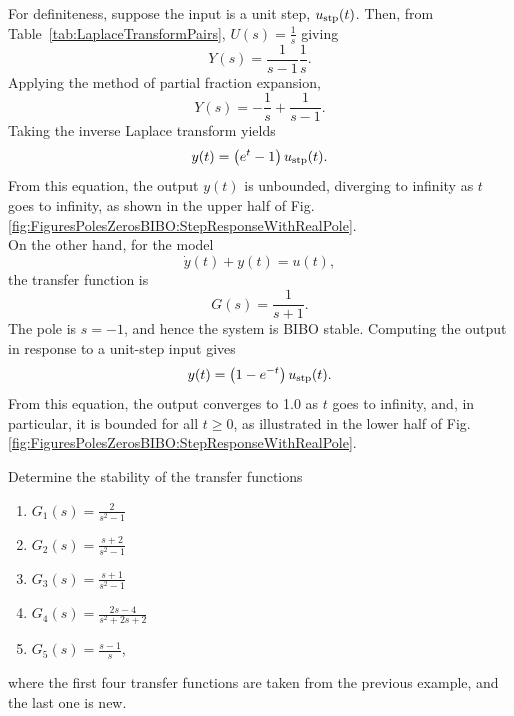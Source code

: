 For definiteness, suppose the input is a unit step, $u_{\rm stp}(t)$. Then, from Table~\ref{tab:LaplaceTransformPairs}, $U(s) = \frac{1}{s}$ giving
$$Y(s) = \frac{1}{s-1} \frac{1}{s}.$$
Applying the method of partial fraction expansion,
$$Y(s) = -\frac{1}{s} + \frac{1}{s-1}.$$
Taking the inverse Laplace transform yields
\begin{equation}
\label{eqn:PolesZerosBIBO:FirstOrderOutputUnstable}
y(t) =\left(e^{t} -1\right) u_{\rm stp}(t).
\end{equation}
From this equation, the output $y(t)$ is unbounded, diverging to infinity as $t$ goes to infinity, as shown in the upper half of Fig. \ref{fig:FiguresPolesZerosBIBO:StepResponseWithRealPole}.\\

On the other hand, for the model
$$ \dot{y}(t) + y(t) = u(t),$$
the transfer function is
$$G(s) = \frac{1}{s+1}.$$
The pole is $s=-1$, and hence the system is BIBO stable. Computing the output in response to a unit-step input gives
\begin{equation}
\label{eqn:PolesZerosBIBO:FirstOrderOutputStable}
y(t) = \left(1-e^{-t} \right) u_{\rm stp}(t).
\end{equation}
From this equation, the output converges to 1.0 as $t$ goes to infinity, and, in particular, it is bounded for all $t\ge0$, as illustrated in the lower half of Fig. \ref{fig:FiguresPolesZerosBIBO:StepResponseWithRealPole}.


\vspace*{.2cm}
\begin{example}
\label{ex:BIBOstabilityOL}
    Determine the stability of the transfer functions 
\begin{enumerate}
\renewcommand{\labelenumi}{(\alph{enumi})}
\setlength{\itemsep}{.2cm}
\item $G_1(s) = \frac{2}{s^2-1}$

\item $G_2(s) = \frac{s+2}{s^2-1}$ 

\item $G_3(s) = \frac{s+1}{s^2-1}$

\item $G_4(s) = \frac{2s-4}{s^2+2s+2}$

\item  $G_5(s) = \frac{s-1}{s}$,
\end{enumerate}
where the first four transfer functions are taken from the previous example, and the last one is new.
\end{example}

